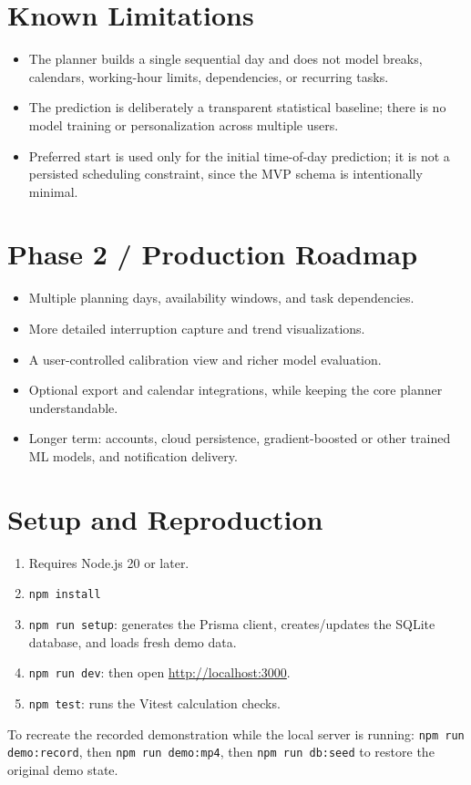 \documentclass[11pt,a4paper]{article}
\begin{document}
\section{Known Limitations}
\begin{itemize}
    \item The planner builds a single sequential day and does not model breaks, calendars,
    working-hour limits, dependencies, or recurring tasks.
    \item The prediction is deliberately a transparent statistical baseline; there is no model training
    or personalization across multiple users.
    \item Preferred start is used only for the initial time-of-day prediction; it is not a persisted
    scheduling constraint, since the MVP schema is intentionally minimal.
\end{itemize}

\section{Phase 2 / Production Roadmap}
\begin{itemize}
    \item Multiple planning days, availability windows, and task dependencies.
    \item More detailed interruption capture and trend visualizations.
    \item A user-controlled calibration view and richer model evaluation.
    \item Optional export and calendar integrations, while keeping the core planner understandable.
    \item Longer term: accounts, cloud persistence, gradient-boosted or other trained ML models, and
    notification delivery.
\end{itemize}

\section{Setup and Reproduction}
\begin{enumerate}
    \item Requires Node.js 20 or later.
    \item \texttt{npm install}
    \item \texttt{npm run setup}: generates the Prisma client, creates/updates the SQLite database,
    and loads fresh demo data.
    \item \texttt{npm run dev}: then open \url{http://localhost:3000}.
    \item \texttt{npm test}: runs the Vitest calculation checks.
\end{enumerate}
To recreate the recorded demonstration while the local server is running: \texttt{npm run
demo:record}, then \texttt{npm run demo:mp4}, then \texttt{npm run db:seed} to restore the original
demo state.
\end{document}
